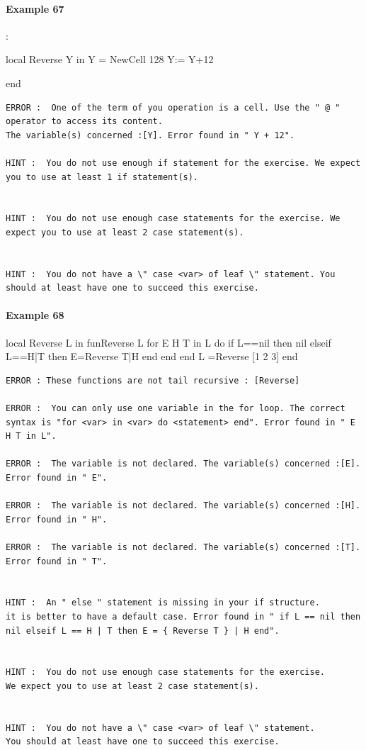 \documentclass[11pt,a4paper,twoside,openright]{report}
\begin{document}
\paragraph{Example 67}:

\begin{OZ}
local Reverse Y in
	Y = {NewCell 128}
	Y:= Y+12

end
\end{OZ}

\begin{lstlisting}
ERROR :  One of the term of you operation is a cell. Use the " @ " operator to access its content. 
The variable(s) concerned :[Y]. Error found in " Y + 12".

HINT :  You do not use enough if statement for the exercise. We expect you to use at least 1 if statement(s).


HINT :  You do not use enough case statements for the exercise. We expect you to use at least 2 case statement(s).


HINT :  You do not have a \" case <var> of leaf \" statement. You should at least have one to succeed this exercise.

\end{lstlisting}

\paragraph{Example 68}

\begin{OZ}
local Reverse L in
	fun{Reverse L}
		for E H T in L do
		    if L==nil then nil
		    elseif L==H|T then E={Reverse T}|H
		    end
		end
	end
L ={Reverse [1 2 3]}
end
\end{OZ}

\begin{lstlisting}
ERROR : These functions are not tail recursive : [Reverse]

ERROR :  You can only use one variable in the for loop. The correct syntax is "for <var> in <var> do <statement> end". Error found in " E H T in L".

ERROR :  The variable is not declared. The variable(s) concerned :[E]. Error found in " E".

ERROR :  The variable is not declared. The variable(s) concerned :[H]. Error found in " H".

ERROR :  The variable is not declared. The variable(s) concerned :[T]. Error found in " T".


HINT :  An " else " statement is missing in your if structure. 
it is better to have a default case. Error found in " if L == nil then 
nil elseif L == H | T then E = { Reverse T } | H end".


HINT :  You do not use enough case statements for the exercise. 
We expect you to use at least 2 case statement(s).


HINT :  You do not have a \" case <var> of leaf \" statement. 
You should at least have one to succeed this exercise.
\end{lstlisting}
\end{document}
